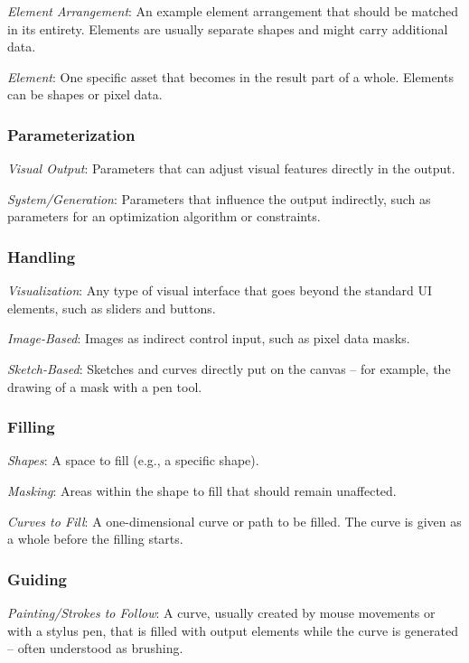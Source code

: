 \textit{Element Arrangement}: An example element arrangement that should be matched in its entirety. Elements are usually separate shapes and might carry additional data.

\textit{Element}: One specific asset that becomes in the result part of a whole. Elements can be shapes or pixel data.


\subsubsection{Parameterization}


\textit{Visual Output}: Parameters that can adjust visual features directly in the output.

\textit{System/Generation}: Parameters that influence the output indirectly, such as parameters for an optimization algorithm or constraints.


\subsubsection{Handling}


\textit{Visualization}: Any type of visual interface that goes beyond the standard UI elements, such as sliders and buttons.

\textit{Image-Based}: Images as indirect control input, such as pixel data masks.

\textit{Sketch-Based}: Sketches and curves directly put on the canvas – for example, the drawing of a mask with a pen tool.


\subsubsection{Filling}


\textit{Shapes}: A space to fill (e.g., a specific shape).

\textit{Masking}: Areas within the shape to fill that should remain unaffected.

\textit{Curves to Fill}: A one-dimensional curve or path to be filled. The curve is given as a whole before the filling starts.


\subsubsection{Guiding}


\textit{Painting/Strokes to Follow}: A curve, usually created by mouse movements or with a stylus pen, that is filled with output elements while the curve is generated – often understood as brushing.

